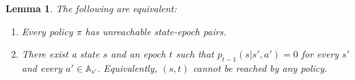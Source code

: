 \documentclass{article}
\newtheorem{lemma}[theorem]{Lemma}
\theoremstyle{definition}
\numberwithin{equation}{section}
\begin{document}
{%



\begin{lemma}
\label{unreach2}
    The following are equivalent:
    \begin{enumerate}
        \item[{\rm (i')}] Every policy $\pi$ has unreachable state-epoch pairs.
        \item[{\rm (ii')}] There exist a state $s$ and an epoch $t$ such that
        $p_{t-1}(s|s',a')=0$ for every $s'$ and every $a'\in \mathbb{A}_{s'}$. Equivalently, $(s,t)$
cannot be reached by any policy.    
\end{enumerate}
\end{lemma}

}
\end{document}
